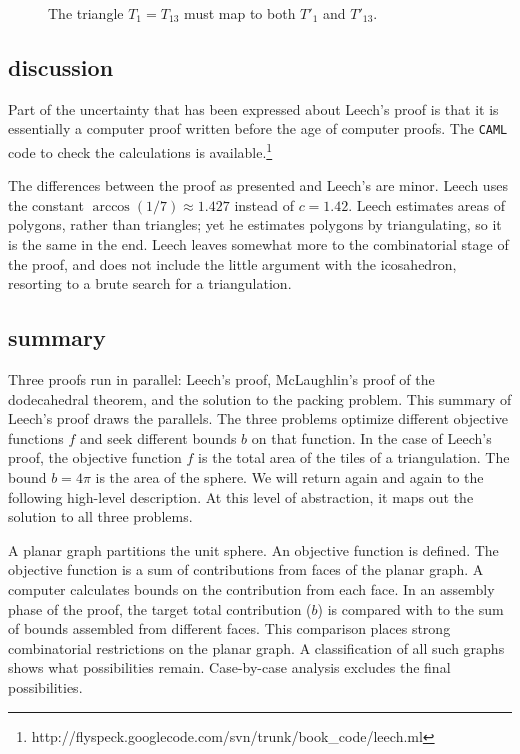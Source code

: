 \begin{figure}[htb]
  \centering
  \caption{The triangle $T_1=T_{13}$ must map to both $T'_1$ and $T'_{13}$.}
  \label{fig:th:D}
\end{figure}


\subsection{discussion}


Part of the uncertainty that has been expressed about
Leech's proof is that it is essentially a computer proof written before
the age of computer proofs.  The {\tt CAML} code  to check the
calculations is available.\footnote{http://flyspeck.googlecode.com/svn/trunk/book\_code/leech.ml}

The differences between the proof as presented and Leech's are minor.  Leech
uses the constant $\arccos(1/7)\approx 1.427$ instead of $c=1.42$.  Leech estimates
areas of polygons, rather than triangles; yet he estimates polygons by triangulating,
so it is the same in the end.  Leech leaves somewhat more to the combinatorial stage of the proof, and  does not include the little argument with
the icosahedron,  resorting to a brute search for a triangulation.

\subsection{summary}\label{sec:summary}

Three proofs run in parallel: Leech's proof, McLaughlin's proof of the dodecahedral theorem, and
the solution to the packing problem.
This summary of Leech's proof draws the parallels.
The three problems optimize different objective functions $f$ and seek different
bounds $b$ on that function. In the case of Leech's proof, the objective
function $f$ is the total 
area of the tiles of a triangulation.  The bound $b=4\pi$ is the area of
the sphere.  We will return again and again to the following high-level description.  At this level of abstraction, it maps out the solution
to all three problems.

{\it

A planar graph partitions the
unit sphere.  An objective function is defined.
The objective function is a sum
of contributions from  faces of the planar graph.  
A computer calculates bounds
on the contribution from each face.  In an assembly phase of the proof, 
the target total contribution ($b$) is compared
with to the sum of bounds assembled from different faces. 
This comparison places
strong combinatorial restrictions on the planar graph.  
A classification of all 
such graphs shows what possibilities remain.  
Case-by-case analysis excludes the final possibilities.

}

